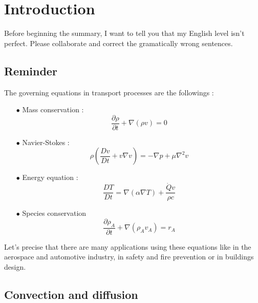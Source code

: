 
\chapter{Introduction}
Before beginning the summary, I want to tell you that my English level isn't perfect. Please collaborate and correct the gramatically wrong sentences.\\

\section{Reminder}
	The governing equations in transport processes are the followings :
	\begin{itemize}
	\item[$\bullet$] Mass conservation : 
		\begin{equation}
			\frac{\partial \rho}{\partial t} + \nabla (\rho v) = 0
		\end{equation}
	\item[$\bullet$] Navier-Stokes :
		\begin{equation}
			\rho \left(\frac{Dv}{Dt} + v \nabla v \right) = -\nabla p + \mu \nabla ^2 v
		\end{equation}		 
	\item[$\bullet$] Energy equation :
		\begin{equation}
			\frac{DT}{Dt} = \nabla (\alpha \nabla T) + \frac{\dot{Q}v}{\rho c}
		\end{equation}
	\item[$\bullet$] Species conservation
		\begin{equation}
			\frac{\partial \rho _A}{\partial t} + \nabla (\rho _A v_A) = r_A
		\end{equation}
	\end{itemize}
	Let's precise that there are many applications using these equations like in the aerospace and automotive industry, in safety and fire prevention or in buildings design.  
	
\section{Convection and diffusion}
